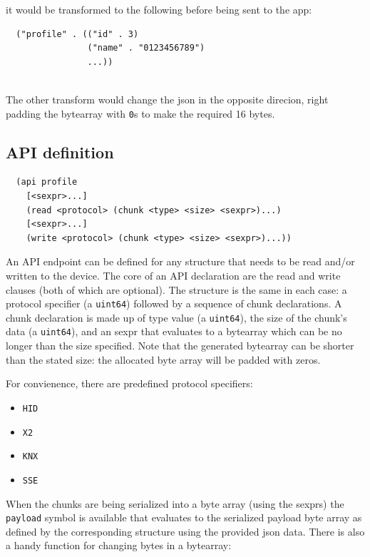 \documentclass[12pt]{article}
\begin{document}
\noindent it would be transformed to the following before being sent
to the app:

\begin{verbatim}
  ("profile" . (("id" . 3)
                ("name" . "0123456789")
                ...))
 
\end{verbatim}

\noindent The other transform would change the json in the opposite
direcion, right padding the bytearray with \verb|0|s to make the
required 16 bytes.

\subsection{API definition}

\begin{verbatim}
  (api profile
    [<sexpr>...]
    (read <protocol> (chunk <type> <size> <sexpr>)...)
    [<sexpr>...]
    (write <protocol> (chunk <type> <size> <sexpr>)...))
\end{verbatim}

\noindent An API endpoint can be defined for any structure that needs
to be read and/or written to the device. The core of an API
declaration are the read and write clauses (both of which are
optional). The structure is the same in each case: a protocol specifier
(a \verb|uint64|) followed by a sequence of chunk declarations. A chunk
declaration is made up of type value (a \verb|uint64|), the size of the chunk's
data (a \verb|uint64|), and an sexpr that evaluates to a bytearray which can be
no longer than the size specified. Note that the generated bytearray
can be shorter than the stated size: the allocated byte array will be
padded with zeros.

For convienence, there are predefined protocol specifiers:

\begin{itemize}
\item \verb|HID|
\item \verb|X2|
\item \verb|KNX|
\item \verb|SSE|
\end{itemize}

When the chunks are being serialized into a byte array (using the
sexprs) the \verb|payload| symbol is available that evaluates to the
serialized payload byte array as defined by the corresponding
structure using the provided json data. There is also a handy function
for changing bytes in a bytearray:
\end{document}
